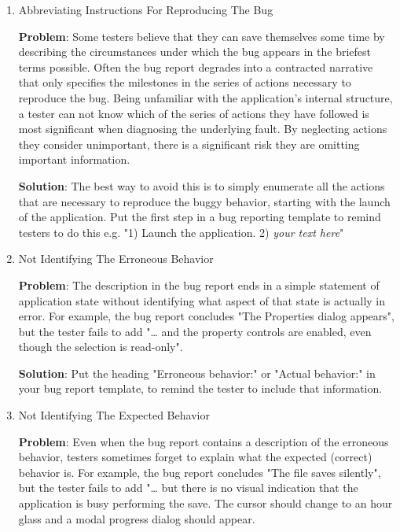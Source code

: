 \documentclass{article}
\begin{document}
\begin{enumerate}
\item Abbreviating Instructions For Reproducing The Bug
\label{sec:orgheadline90}

\textbf{Problem}: Some testers believe that they can save themselves some time
by describing the circumstances under which the bug appears in the
briefest terms possible. Often the bug report degrades into a contracted
narrative that only specifies the milestones in the series of actions
necessary to reproduce the bug. Being unfamiliar with the application's
internal structure, a tester can not know which of the series of actions
they have followed is most significant when diagnosing the underlying
fault. By neglecting actions they consider unimportant, there is a
significant risk they are omitting important information.

\textbf{Solution}: The best way to avoid this is to simply enumerate all the
actions that are necessary to reproduce the buggy behavior, starting
with the launch of the application. Put the first step in a bug
reporting template to remind testers to do this e.g. "1) Launch the
application. 2) \emph{your text here}"

\item Not Identifying The Erroneous Behavior
\label{sec:orgheadline91}

\textbf{Problem}: The description in the bug report ends in a simple statement
of application state without identifying what aspect of that state is
actually in error. For example, the bug report concludes "The Properties
dialog appears", but the tester fails to add "\ldots{} and the property
controls are enabled, even though the selection is read-only".

\textbf{Solution}: Put the heading "Erroneous behavior:" or "Actual behavior:"
in your bug report template, to remind the tester to include that
information.

\item Not Identifying The Expected Behavior
\label{sec:orgheadline92}

\textbf{Problem}: Even when the bug report contains a description of the
erroneous behavior, testers sometimes forget to explain what the
expected (correct) behavior is. For example, the bug report concludes
"The file saves silently", but the tester fails to add "\ldots{} but there is
no visual indication that the application is busy performing the save.
The cursor should change to an hour glass and a modal progress dialog
should appear.


\end{enumerate}
\end{document}
